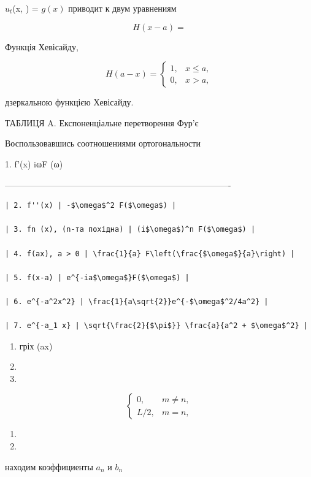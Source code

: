 \documentclass[
  ukrainian,
]{article}
\providecommand{\tightlist}{%
  \setlength{\itemsep}{0pt}\setlength{\parskip}{0pt}}
\begin{document}
\(u_t\)(x, \theta) = \(g(x)\) приводит к двум уравнениям

\[
H(x-a) =
\]

Функція Хевісайду,

\[
H(a-x) = \begin{cases} 1, & x \leqslant a, \\ 0, & x > a, \end{cases}
\]

дзеркальною функцією Хевісайду.

ТАБЛИЦЯ A. Експоненціальне перетворення Фур'є

Воспользовавшись соотношениями ортогональности

1. f'(x) \textbar{} iωF (ω) \textbar{}

\textbar------------------------------\textbar-------------------------------------------------\textbar{}

\begin{verbatim}
| 2. f''(x) | -$\omega$^2 F($\omega$) |

| 3. fn (x), (n-та похідна) | (i$\omega$)^n F($\omega$) |

| 4. f(ax), a > 0 | \frac{1}{a} F\left(\frac{$\omega$}{a}\right) |

| 5. f(x-a) | e^{-ia$\omega$}F($\omega$) |

| 6. e^{-a^2x^2} | \frac{1}{a\sqrt{2}}e^{-$\omega$^2/4a^2} |

| 7. e^{-a_1 x} | \sqrt{\frac{2}{$\pi$}} \frac{a}{a^2 + $\omega$^2} |
\end{verbatim}

\begin{enumerate}
\def\labelenumi{\arabic{enumi}.}
\setcounter{enumi}{19}
\item
  гріх (ax)
\item
\item
\end{enumerate}

\[
\begin{cases} 0, & m \neq n, \\ L/2, & m = n, \end{cases}
\]

\begin{enumerate}
\def\labelenumi{\arabic{enumi}.}
\setcounter{enumi}{9}
\tightlist
\item
\item
\end{enumerate}

находим коэффициенты \(a_n\) и \(b_n\)
\end{document}
